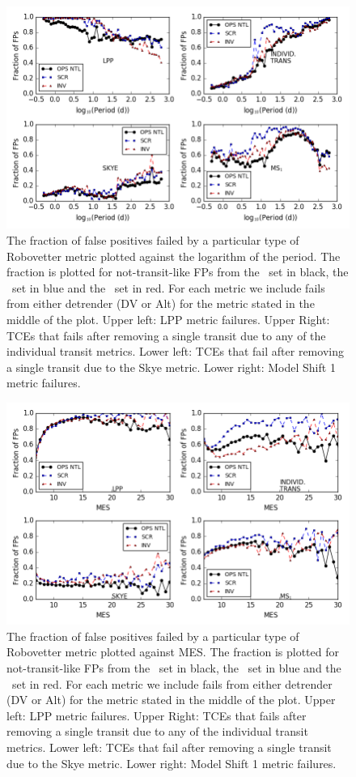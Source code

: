 \begin{figure}
    \centering
    \includegraphics[width=0.9\linewidth]{fig-fractionFailsByMetric.png}
    \caption{The fraction of false positives failed by a particular type of Robovetter metric plotted against the logarithm of the period.  The fraction is plotted for not-transit-like FPs from the \opstce\ set in black, the \scrtce\ set in blue and the \invtce\ set in red. For each metric we include fails from either detrender (DV or Alt) for the metric stated in the middle of the plot. Upper left: LPP metric failures. Upper Right: TCEs that fails after removing a single transit due to any of the individual transit metrics.  Lower left: TCEs that fail after removing a single transit due to the Skye metric. Lower right: Model Shift 1 metric failures. }
    \label{f:fractionFailMetric}
\end{figure}

\begin{figure}
    \centering
    \includegraphics[width=0.9\linewidth]{fig-fractionFailsByMetricMes.png}
    \caption{The fraction of false positives failed by a particular type of Robovetter metric plotted against MES.  The fraction is plotted for not-transit-like FPs from the \opstce\ set in black, the \scrtce\ set in blue and the \invtce\ set in red. For each metric we include fails from either detrender (DV or Alt) for the metric stated in the middle of the plot. Upper left: LPP metric failures. Upper Right: TCEs that fails after removing a single transit due to any of the individual transit metrics.  Lower left: TCEs that fail after removing a single transit due to the Skye metric. Lower right: Model Shift 1 metric failures. }
    \label{f:fractionFailMetricMes}
\end{figure}